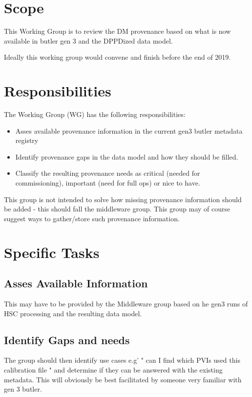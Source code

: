 
\section{Scope}

This Working Group is to review the DM provenance based on what is now
available in butler gen 3 and the DPPDized data model.

 Ideally this working group would convene and finish before the end of 2019.

\section{Responsibilities}

The Working Group (WG) has the following responsibilities:

\begin{itemize}
    \item Asses available provenance information in the current gen3 butler metadata registry
    \item Identify provenance gaps in the data model and how they should be filled.
    \item Classify the resulting provenance needs as critical (needed for commissioning), important (need for full ops) or nice to have.
\end{itemize}

This group is not intended to solve how missing provenance information should be added - this should fall the middleware group.
This group may of course suggest ways to gather/store such provenance information.

\section{Specific Tasks}

\subsection{ Asses Available Information}

This may have to be provided by the Middleware group based on he gen3 runs of HSC processing and the
resulting data model.

\subsection{Identify Gaps and needs}
The group should then identify use cases e.g' " can I find which PVIs used this calibration file " and determine if they can be answered with the existing metadata. This will obviously be best facilitated by someone very familiar with gen 3 butler.

